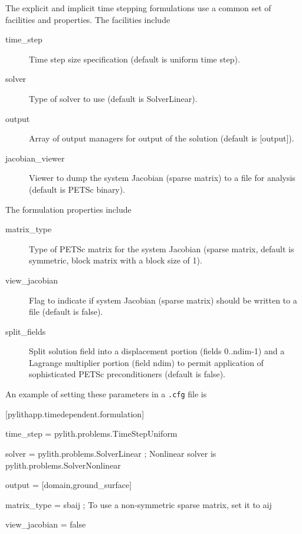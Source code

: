 The explicit and implicit time stepping formulations use a common
set of facilities and properties. The facilities include
\begin{description}
\item [{time\_step}] Time step size specification (default is uniform time
step).
\item [{solver}] Type of solver to use (default is SolverLinear).
\item [{output}] Array of output managers for output of the solution (default
is {[}output{]}).
\item [{jacobian\_viewer}] Viewer to dump the system Jacobian (sparse matrix)
to a file for analysis (default is PETSc binary).
\end{description}
The formulation properties include
\begin{description}
\item [{matrix\_type}] Type of PETSc matrix for the system Jacobian (sparse
matrix, default is symmetric, block matrix with a block size of 1).
\item [{view\_jacobian}] Flag to indicate if system Jacobian (sparse matrix)
should be written to a file (default is false).
\item [{split\_fields}] Split solution field into a displacement portion
(fields 0..ndim-1) and a Lagrange multiplier portion (field ndim)
to permit application of sophisticated PETSc preconditioners (default
is false).
\end{description}
An example of setting these parameters in a \texttt{.cfg} file is
\begin{lyxcode}
{\footnotesize{}{[}pylithapp.timedependent.formulation{]}}{\footnotesize \par}

{\footnotesize{}time\_step = pylith.problems.TimeStepUniform}{\footnotesize \par}

{\footnotesize{}solver = pylith.problems.SolverLinear ; Nonlinear solver is pylith.problems.SolverNonlinear}{\footnotesize \par}

{\footnotesize{}output = {[}domain,ground\_surface{]}}{\footnotesize \par}

{\footnotesize{}matrix\_type = sbaij ; To use a non-symmetric sparse matrix, set it to aij}{\footnotesize \par}

{\footnotesize{}view\_jacobian = false}{\footnotesize \par}
\end{lyxcode}

